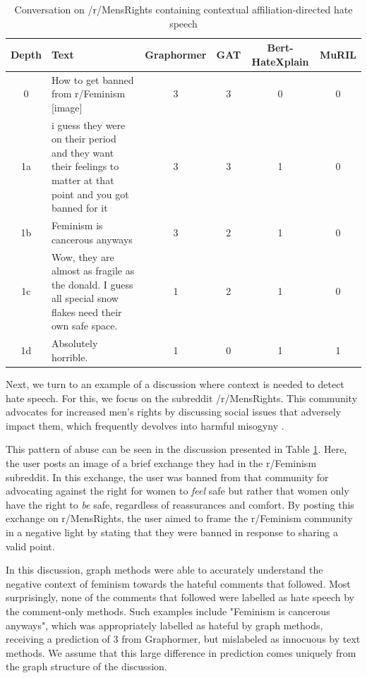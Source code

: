 \documentclass[letterpaper]{article} %
\newcommand{\edit}[1]{{#1}}
\begin{document}
\begin{table}
\centering
\caption{Conversation on /r/MensRights containing contextual affiliation-directed hate speech}
\begin{tabular}{c|p{8cm}|c|c|c|c}
Depth & Text & Graphormer & GAT & Bert-HateXplain & MuRIL \\
\hline
\hline
0 & How to get banned from r/Feminism [image] & 3 & 3 & 0 & 0 \\
\hline
1a & i guess they were on their period and they want their feelings to matter at that point and you got banned for it & 3 & 3 & 1 & 0  \\
\hline
1b & Feminism is cancerous anyways & 3 & 2 & 1 & 0  \\
\hline
1c & Wow, they are almost as fragile as the donald. I guess all special snow flakes need their own safe space. & 1 & 2 & 1 & 0 \\
\hline
1d & Absolutely horrible. & 1 & 0 & 1 & 1 \\
\end{tabular}
\label{tab:contextual-mens-rights}
\end{table}
Next, we turn to an example of a discussion where context is needed to detect hate speech. \edit{For this, we focus on the subreddit /r/MensRights.  This community advocates for increased men's rights by discussing social issues that adversely impact them, which frequently devolves into harmful misogyny \cite{socsci5020018}}.

This pattern of abuse can be seen in the discussion presented in Table \ref{tab:contextual-mens-rights}. Here, the user posts an image of a brief exchange they had in the r/Feminism subreddit. In this exchange, the user was banned from that community for advocating against the right for women to \textit{feel} safe but rather that women only have the right to \textit{be} safe, regardless of reassurances and comfort. By posting this exchange on r/MensRights, the user aimed to frame the r/Feminism community in a negative light by stating that they were banned in response to sharing a valid point.

In this discussion, graph methods were able to accurately understand the negative context of feminism towards the hateful comments that followed. Most surprisingly, none of the comments that followed were labelled as hate speech by the comment-only methods. Such examples include "Feminism is cancerous anyways", which was appropriately labelled as hateful by graph methods, receiving a prediction of 3 from Graphormer, but mislabeled as innocuous by text methods. We assume that this large difference in prediction comes uniquely from the graph structure of the discussion.
\end{document}
